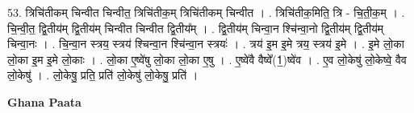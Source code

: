 \documentclass[17pt]{extarticle}
\begin{document}
53. त्रिचि॑तीकम् चिन्वीत चिन्वीत॒ त्रिचि॑तीक॒म् त्रिचि॑तीकम् चिन्वीत । . त्रिचि॑तीक॒मिति॒ त्रि - चि॒ती॒क॒म् । . चि॒न्वी॒त॒ द्वि॒तीय॑म् द्वि॒तीय॑म् चिन्वीत चिन्वीत द्वि॒तीय᳚म् । . द्वि॒तीय॑म् चिन्वा॒न श्चि॑न्वा॒नो द्वि॒तीय॑म् द्वि॒तीय॑म् चिन्वा॒नः । . चि॒न्वा॒न स्त्रय॒ स्त्रय॑ श्चिन्वा॒न श्चि॑न्वा॒न स्त्रयः॑ । . त्रय॑ इ॒म इ॒मे त्रय॒ स्त्रय॑ इ॒मे । . इ॒मे लो॒का लो॒का इ॒म इ॒मे लो॒काः । . लो॒का ए॒ष्वे॑षु लो॒का लो॒का ए॒षु । . ए॒ष्वे॑वै वैष्वे᳚(1॒)ष्वे॑व । . ए॒व लो॒केषु॑ लो॒केष्वे॒ वैव लो॒केषु॑ । . लो॒केषु॒ प्रति॒ प्रति॑ लो॒केषु॑ लो॒केषु॒ प्रति॑ । \newline

\textbf{Ghana Paata } \newline
\end{document}
